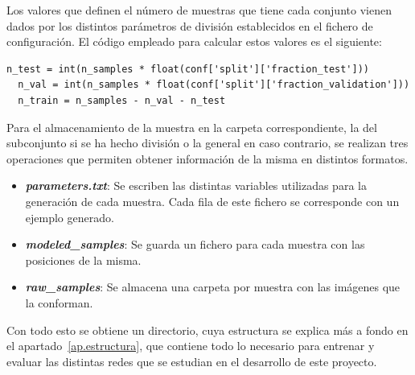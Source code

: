 Los valores que definen el número de muestras que tiene cada conjunto vienen dados por los distintos parámetros de división establecidos en el fichero de configuración. El código empleado para calcular estos valores es el siguiente:
\vspace{10pt}
\begin{lstlisting}[frame=single]
  n_test = int(n_samples * float(conf['split']['fraction_test']))
  n_val = int(n_samples * float(conf['split']['fraction_validation']))
  n_train = n_samples - n_val - n_test
\end{lstlisting}

Para el almacenamiento de la muestra en la carpeta correspondiente, la del subconjunto si se ha hecho división o la general en caso contrario, se realizan tres operaciones que permiten obtener información de la misma en distintos formatos.

\begin{itemize}
    \setlength\itemsep{3pt}
    \item \textbf{\textit{parameters.txt}}: Se escriben las distintas variables utilizadas para la generación de cada muestra. Cada fila de este fichero se corresponde con un ejemplo generado.
    \item \textbf{\textit{modeled}\_\textit{samples}}: Se guarda un fichero para cada muestra con las posiciones de la misma.
    \item \textbf{\textit{raw}\_\textit{samples}}: Se almacena una carpeta por muestra con las imágenes que la conforman.
\end{itemize}

Con todo esto se obtiene un directorio, cuya estructura se explica más a fondo en el apartado~\ref{ap.estructura}, que contiene todo lo necesario para entrenar y evaluar las distintas redes que se estudian en el desarrollo de este proyecto.